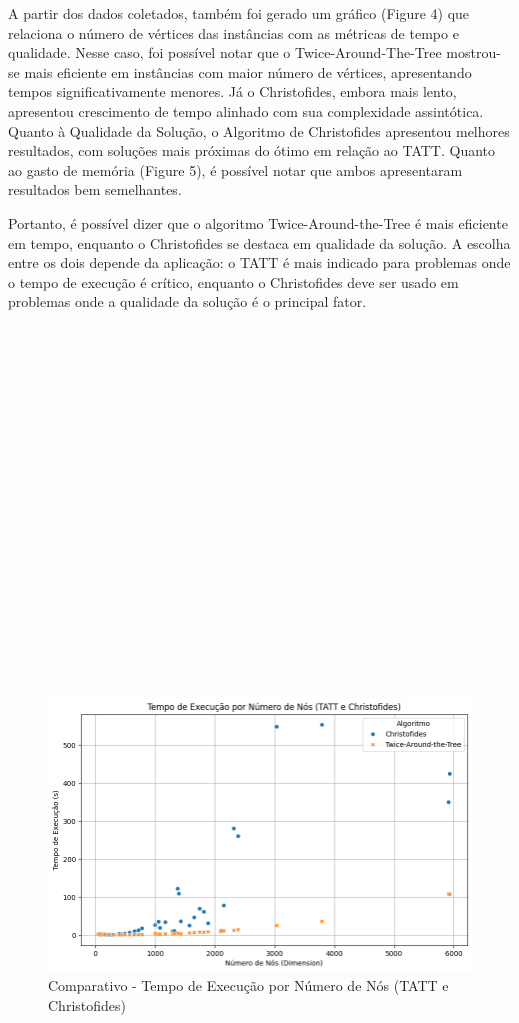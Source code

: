 \documentclass[12pt]{article}
\begin{document}
A partir dos dados coletados, também foi gerado um gráfico (Figure 4) que relaciona o número de vértices das instâncias com as métricas de tempo e qualidade. Nesse caso, foi possível notar que o Twice-Around-The-Tree mostrou-se mais eficiente em instâncias com maior número de vértices, apresentando tempos significativamente menores.
Já o Christofides, embora mais lento, apresentou crescimento de tempo alinhado com sua complexidade assintótica. Quanto à Qualidade da Solução, o Algoritmo de Christofides apresentou melhores resultados, com soluções mais próximas do ótimo em relação ao TATT. Quanto ao gasto de memória (Figure 5), é possível notar que ambos apresentaram resultados bem semelhantes.

Portanto, é possível dizer que o algoritmo Twice-Around-the-Tree é mais eficiente em tempo, enquanto o Christofides se destaca em qualidade da solução. A escolha entre os dois depende da aplicação: o TATT é mais indicado para problemas onde o tempo de execução é crítico, enquanto o Christofides deve ser usado em problemas onde a qualidade da solução é o principal fator.
\\
\\
\\
\\
\\
\\
\\
\\
\\
\\
\\
\\
\\
\\
\\
\\
\\
\\
\\
\\

\begin{figure}[ht]
\centering
\includegraphics[width=.7\textwidth]{Figure3.png}
\caption{Comparativo - Tempo de Execução por Número de Nós (TATT e Christofides)}
\label{fig:exampleFig3}
\end{figure}
\end{document}
